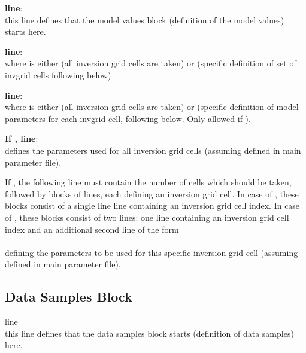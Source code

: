 {\bf line}: \\
this line defines that the model values block (definition of the model values) starts here. 

{\bf line}: \\
where  is either  (all inversion grid cells are taken) or  
(specific definition of set of invgrid cells following below)

{\bf line}: \\
where  is either  (all inversion grid cells are taken) or  
(specific definition of model parameters for each invgrid cell, following below. Only allowed if 
). 

{\bf If , line}: \\
defines the parameters used for all inversion grid cells (assuming  defined in main parameter file).

If , the following line must contain the number of cells  
which should be taken, followed by  blocks of lines, each defining an inversion grid cell. In case
of , these blocks consist of a single line line containing an inversion grid cell index.
In case of , these blocks consist of two lines: one line containing an inversion grid cell
index and an additional second line of the form\\
 \\
defining the parameters to be used for this specific inversion grid cell (assuming  defined in main parameter file).

\subsection{Data Samples Block}
line \\
this line defines that the data samples block starts (definition of data samples) here. 

